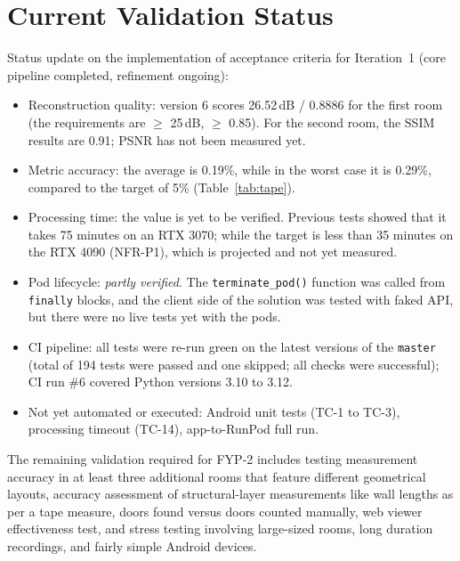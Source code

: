 \section{Current Validation Status}
Status update on the implementation of acceptance criteria for Iteration~1 (core pipeline completed, refinement ongoing):
\begin{itemize}
    \item Reconstruction quality: version 6 scores 26.52\,dB / 0.8886 for the first room (the requirements are $\geq$ 25\,dB, $\geq$ 0.85). For the second room, the SSIM results are 0.91; PSNR has not been measured yet.
    \item Metric accuracy: the average is 0.19\%, while in the worst case it is 0.29\%, compared to the target of 5\% (Table~\ref{tab:tape}).
    \item Processing time: the value is yet to be verified. Previous tests showed that it takes 75 minutes on an RTX 3070; while the target is less than 35 minutes on the RTX 4090 (NFR-P1), which is projected and not yet measured.
    \item Pod lifecycle: \emph{partly verified}. The \texttt{terminate\_pod()} function was called from \texttt{finally} blocks, and the client side of the solution was tested with faked API, but there were no live tests yet with the pods.
    \item CI pipeline: all tests were re-run green on the latest versions of the \texttt{master} (total of 194 tests were passed and one skipped; all checks were successful); CI run \#6 covered Python versions 3.10 to 3.12.
    \item Not yet automated or executed: Android unit tests (TC-1 to TC-3), processing timeout (TC-14), app-to-RunPod full run.
\end{itemize}

The remaining validation required for FYP-2 includes testing measurement accuracy in at least three additional rooms that feature different geometrical layouts, accuracy assessment of structural-layer measurements like wall lengths as per a tape measure, doors found versus doors counted manually, web viewer effectiveness test, and stress testing involving large-sized rooms, long duration recordings, and fairly simple Android devices.
